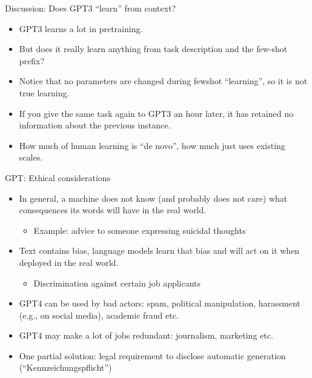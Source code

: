 \documentclass[11pt,compress,t,notes=noshow, xcolor=table]{beamer}
\begin{document}

\begin{frame}{Discussion: Does GPT3 ``learn'' from context?}

\vfill

  \begin{itemize}
\item GPT3 learns a lot in pretraining.
    \item But does it really learn anything from
task description and    the few-shot prefix?
    \item Notice that no parameters are changed during
    fewshot ``learning'', so it is not true learning.
    \item If you give the same task again to GPT3 an
    hour later, it has retained no information about the
    previous instance.
    \item How much of human learning is ``de novo'',
    how much just uses existing scales.

    \end{itemize}

\vfill

\end{frame}


\begin{frame}{GPT: Ethical considerations}

\vfill

  \begin{itemize}
\item In general, a machine does not know (and
probably does not care) what consequences its words will have
in the real world.
  \begin{itemize}
\item Example: advice to someone expressing suicidal thoughts
    \end{itemize}
\item Text contains bias, language models learn that
bias and will act on it when deployed in the real world.
  \begin{itemize}
\item Discrimination against certain job applicants
    \end{itemize}
\item GPT4 can be
used by bad actors: spam, political manipulation, harassment
(e.g., on social media), academic fraud etc.
\item GPT4 may make a
lot of jobs redundant: journalism, marketing etc.
\item One partial solution: legal requirement to
disclose automatic generation (``Kennzeichungspflicht'')
    \end{itemize}

\vfill

\end{frame}
\end{document}

